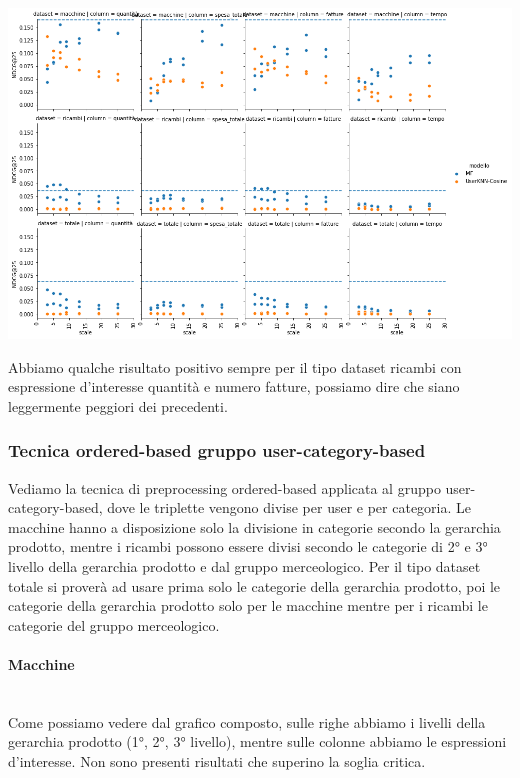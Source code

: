 \includegraphics[width=16cm]{figures/risultati_ordered_singolo.png}

Abbiamo qualche risultato positivo sempre per il tipo dataset ricambi con espressione d'interesse quantità e numero fatture, possiamo dire che siano leggermente peggiori dei precedenti.
\newpage

\subsubsection{Tecnica ordered-based gruppo user-category-based}
Vediamo la tecnica di preprocessing ordered-based applicata al gruppo user-category-based, dove le triplette vengono divise per user e per categoria.
Le macchine hanno a disposizione solo la divisione in categorie secondo la gerarchia prodotto, mentre i ricambi possono essere divisi secondo le categorie di 2° e 3° livello della gerarchia prodotto e dal gruppo merceologico. Per il tipo dataset totale si proverà ad usare prima solo le categorie della gerarchia prodotto, poi le categorie della gerarchia prodotto solo per le macchine mentre per i ricambi le categorie del gruppo merceologico.

\paragraph{Macchine}\mbox{} \\
Come possiamo vedere dal grafico composto, sulle righe abbiamo i livelli della gerarchia prodotto (1°, 2°, 3° livello), mentre sulle colonne abbiamo le espressioni d'interesse. 
Non sono presenti risultati che superino la soglia critica.\\

